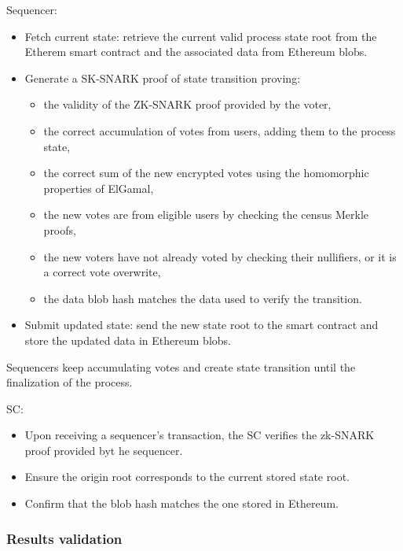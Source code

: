 Sequencer:

\begin{itemize}
	\item Fetch current state: retrieve the current valid process state root from the Etherem smart contract and the associated data from Ethereum blobs.
	\item Generate a SK-SNARK proof of state transition proving:
		\begin{itemize}
			\item the validity of the ZK-SNARK proof provided by the voter,
			\item the correct accumulation of votes from users, adding them to the process state,
			\item the correct sum of the new encrypted votes using the homomorphic properties of ElGamal,
			\item the new votes are from eligible users by checking the census Merkle proofs,
			\item the new voters have not already voted by checking their nullifiers, or it is a correct vote overwrite,
			\item the data blob hash matches the data used to verify the transition.
		\end{itemize}
	\item Submit updated state: send the new state root to the smart contract and store the updated data in Ethereum blobs.
\end{itemize}

Sequencers keep accumulating votes and create state transition until the finalization of the process.


SC:

\begin{itemize}
	\item Upon receiving a sequencer's transaction, the SC verifies the zk-SNARK proof provided byt he sequencer.
	\item Ensure the origin root corresponds to the current stored state root.
	\item Confirm that the blob hash matches the one stored in Ethereum.
\end{itemize}

\subsubsection{Results validation}
\label{sec:vocdoni-protocol:validation}

